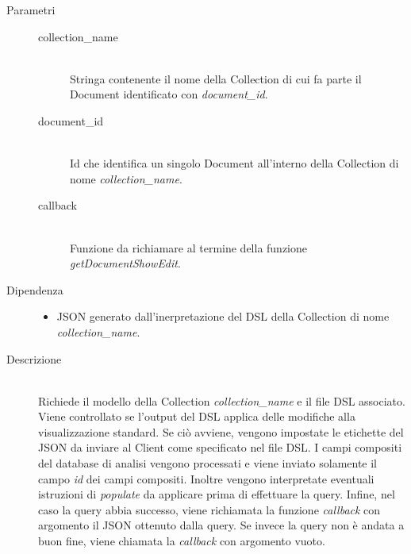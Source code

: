 \begin{description}
\begin{mldescription}
	 \hfill
		\begin{description}
			\item[Parametri] \hfill
				\begin{description}
					\item[collection\_name] \hfill \\
						Stringa contenente il nome della Collection di cui fa parte il Document identificato 							con \textit{document\_id}.
					\item[document\_id] \hfill \\
						Id che identifica un singolo Document all'interno della Collection di nome 									\textit{collection\_name}.
					\item[callback] \hfill \\
						Funzione da richiamare al termine della funzione \textit{getDocumentShowEdit}.
				\end{description}
			\item[Dipendenza] \hfill
				\begin{itemize}
					\item JSON generato dall'inerpretazione del DSL della Collection di nome 										\textit{collection\_name}.
				\end{itemize}
			\item[Descrizione] \hfill \\
			Richiede il modello della Collection \textit{collection\_name} e il file DSL associato. Viene controllato se l'output del DSL applica delle modifiche alla visualizzazione standard. Se ciò avviene, vengono impostate le etichette del JSON da inviare al Client come specificato nel file DSL. I campi compositi del database di analisi vengono processati e viene inviato solamente il campo \textit{id} dei campi compositi. Inoltre vengono interpretate eventuali istruzioni di \textit{populate} da applicare prima di effettuare la query. Infine, nel caso la query abbia successo, viene richiamata la funzione \textit{callback} con argomento il JSON ottenuto dalla query. Se invece la query non è andata a buon fine, viene chiamata la \textit{callback} con argomento vuoto.
		\end{description}
	

\end{mldescription}
\end{description}
